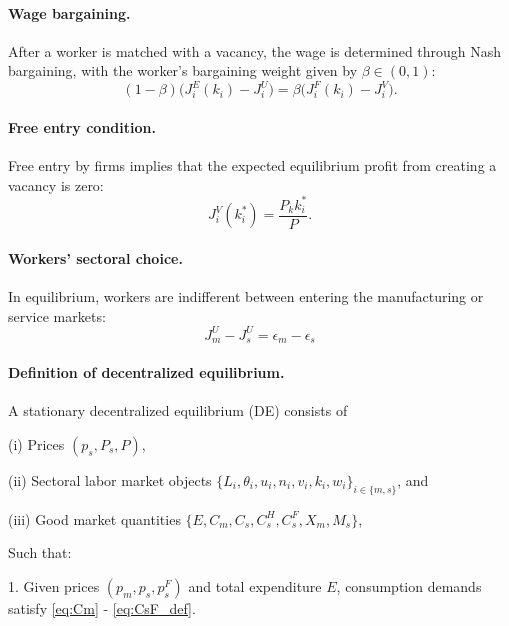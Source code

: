 \documentclass[12pt]{article} %
\theoremstyle{definition}
\begin{document}
\paragraph{Wage bargaining.} After a worker is matched with a vacancy, the wage is determined through Nash bargaining, with the worker's bargaining weight given by $\beta\in(0,1)$:
\begin{equation}\label{eq:nash}
(1-\beta)\big(J_i^E(k_i)-J_i^U\big)=\beta\big(J_i^F(k_i)-J_i^V\big).
\end{equation}


\paragraph{Free entry condition.} Free entry by firms implies that the expected equilibrium profit from creating a vacancy is zero:
\begin{equation}\label{eq:JV=0}
    J_i^V(k^*_i) =\frac{P_kk^*_i}{P}. 
\end{equation}

\paragraph{Workers' sectoral choice.} In equilibrium, workers are indifferent between entering the manufacturing or service markets:
\begin{equation}
    J^U_m - J^U_s = \epsilon_m-\epsilon_s \label{eq:JUm=JUs}
\end{equation}








\paragraph{Definition of decentralized equilibrium.}

A stationary decentralized equilibrium (DE) consists of

(i) Prices $(p_s, P_s, P)$, 

(ii) Sectoral labor market  objects $\{  L_i, \theta_i, u_i, n_i, v_i, k_i, w_i            \}_{i\in  \{m, s\} }$, and

(iii) Good market quantities 
$\{E, C_m, C_s, C^H_s, C^F_s, X_m, M_s\}$, 


Such that:

1. Given prices $(p_m, p_s, p_s^F)$ and total expenditure $E$, consumption demands satisfy \eqref{eq:Cm} - \eqref{eq:CsF_def}. 
\end{document}
